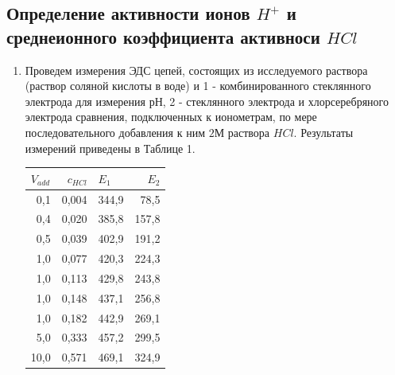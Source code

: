 \documentclass[a4paper,12pt]{article}
\begin{document}
\subsection{Определение активности ионов $H^{+}$ и среднеионного коэффициента активноси $HCl$}
\begin{enumerate}
    
\item Проведем измерения ЭДС цепей, состоящих из исследуемого раствора (раствор соляной кислоты в воде) и 1 - комбинированного стеклянного электрода для измерения рН, 2 - стеклянного электрода и хлорсеребряного  электрода сравнения, подключенных к ионометрам, по мере последовательного добавления к ним $2М$ раствора $HCl$. Результаты измерений приведены в Таблице 1.

\begin{table}[h!]
\centering
\begin{tabular}{|r|r|r|r|}
\hline
\multicolumn{1}{|l|}{\textbf{$V_{add}$}} & \textbf{$c_{HCl}$} & \multicolumn{1}{l|}{\textbf{$E_{1}$}} & \textbf{$E_{2}$} \\ \hline
0,1                                       & 0,004               & 344,9                                  & 78,5              \\ \hline
0,4                                       & 0,020                & 385,8                                  & 157,8             \\ \hline
0,5                                       & 0,039               & 402,9                                  & 191,2             \\ \hline
1,0                                         & 0,077               & 420,3                                  & 224,3             \\ \hline
1,0                                         & 0,113               & 429,8                                  & 243,8             \\ \hline
1,0                                         & 0,148               & 437,1                                  & 256,8             \\ \hline
1,0                                         & 0,182               & 442,9                                  & 269,1             \\ \hline
5,0                                         & 0,333               & 457,2                                  & 299,5             \\ \hline
10,0                                        & 0,571               & 469,1                                  & 324,9             \\ \hline

\end{tabular}
\end{table}
\end{enumerate}
\end{document}

